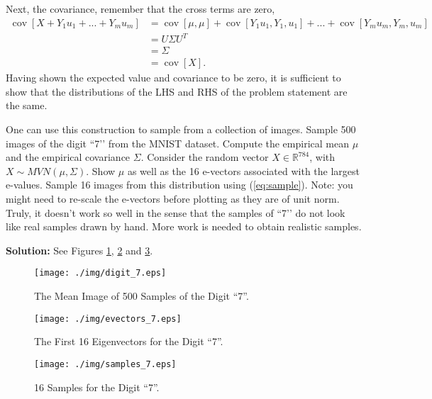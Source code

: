 \documentclass{article}[12pt]
\begin{document}
\begin{enumerate}
Next, the covariance, remember that the cross terms are zero,
\begin{equation}
	\begin{aligned}
		\operatorname{cov} \left[ X + Y_1 u_1 + ... + Y_m u_m \right] &= \operatorname{cov} \left[ \mu, \mu \right] + \operatorname{cov} \left[ Y_1 u_1, Y_1, u_1 \right] + ... + \operatorname{cov} \left[ Y_m u_m, Y_m, u_m \right] \\
									      &= U \Sigma U^T \\
									      &= \Sigma \\
									      &= \operatorname{cov} \left[ X \right].
	\end{aligned}
\end{equation}
Having shown the expected value and covariance to be zero, it is sufficient to show that the distributions of the LHS and RHS of the problem statement are the same.



One can use this construction to sample from a collection of images. Sample 500 images of the digit ``7\rq\rq{} from the MNIST dataset. 
Compute the empirical mean $\mu$ and the empirical covariance $\Sigma$. Consider the random vector $X \in \mathbb{R}^{784}$, with $X \sim MVN (\mu,\Sigma)$. 
Show $\mu$ as well as the 16 e-vectors associated with the largest e-values.  Sample 16 images from this distribution using (\ref{eq:sample}). Note: you might need to re-scale the e-vectors before plotting as they are of unit norm.  Truly, it doesn\rq{}t work so well in the sense that the samples of ``7\rq\rq{} do not look like real samples drawn by hand. More work is needed to obtain realistic samples.

\textbf{Solution: }See Figures \ref{fig:mean}, \ref{fig:evec} and \ref{fig:samps}.
\begin{figure}
	\centering
	\texttt{[image: ./img/digit\_7.eps]}
	\caption{The Mean Image of 500 Samples of the Digit ``7''.}%
	\label{fig:mean}
\end{figure}
\begin{figure}
	\centering
	\texttt{[image: ./img/evectors\_7.eps]}
	\caption{The First 16 Eigenvectors for the Digit ``7''.}%
	\label{fig:evec}
\end{figure}
\begin{figure}
	\centering
	\texttt{[image: ./img/samples\_7.eps]}
	\caption{16 Samples for the Digit ``7''.}%
	\label{fig:samps}
\end{figure}


\end{enumerate}
\end{document}

